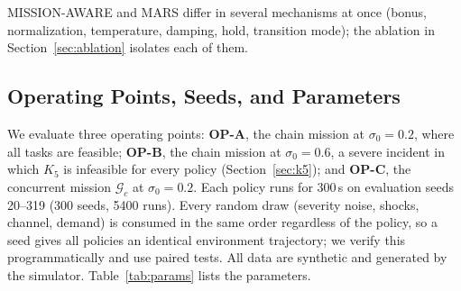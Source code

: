 \documentclass[conference]{IEEEtran}
\begin{document}
MISSION-AWARE and MARS differ in several mechanisms at once (bonus, normalization, temperature, damping, hold, transition mode); the ablation in Section~\ref{sec:ablation} isolates each of them.

\subsection{Operating Points, Seeds, and Parameters}
We evaluate three operating points: \textbf{OP-A}, the chain mission at $\sigma_0=0.2$, where all tasks are feasible; \textbf{OP-B}, the chain mission at $\sigma_0=0.6$, a severe incident in which $K_5$ is infeasible for every policy (Section~\ref{sec:k5}); and \textbf{OP-C}, the concurrent mission $\mathcal{G}_c$ at $\sigma_0=0.2$. Each policy runs for 300\,s on evaluation seeds 20--319 (300 seeds, 5400 runs). Every random draw (severity noise, shocks, channel, demand) is consumed in the same order regardless of the policy, so a seed gives all policies an identical environment trajectory; we verify this programmatically and use paired tests. All data are synthetic and generated by the simulator. Table~\ref{tab:params} lists the parameters.
\end{document}
